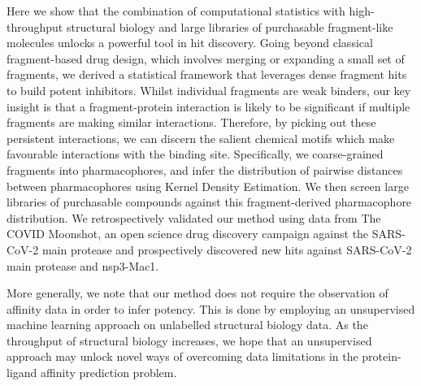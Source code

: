 Here we show that the combination of computational statistics with high-throughput structural biology and large libraries of purchasable fragment-like molecules unlocks a powerful tool in hit discovery. Going beyond classical fragment-based drug design, which involves merging or expanding a small set of fragments, we derived a statistical framework that leverages dense fragment hits to build potent inhibitors. Whilst individual fragments are weak binders, our key insight is that a fragment-protein interaction is likely to be significant if multiple fragments are making similar interactions. Therefore, by picking out these persistent interactions, we can discern the salient chemical motifs which make favourable interactions with the binding site. Specifically, we coarse-grained fragments into pharmacophores, and infer the distribution of pairwise distances between pharmacophores using Kernel Density Estimation. We then screen large libraries of purchasable compounds against this fragment-derived pharmacophore distribution. We retrospectively validated our method using data from The COVID Moonshot, an open science drug discovery campaign against the SARS-CoV-2 main protease and prospectively discovered new hits against SARS-CoV-2 main protease and nsp3-Mac1.


More generally, we note that our method does not require the observation of affinity data in order to infer potency. This is done by employing an unsupervised machine learning approach on unlabelled structural biology data. As the throughput of structural biology increases, we hope that an unsupervised approach may unlock novel ways of overcoming data limitations in the protein-ligand affinity prediction problem.

